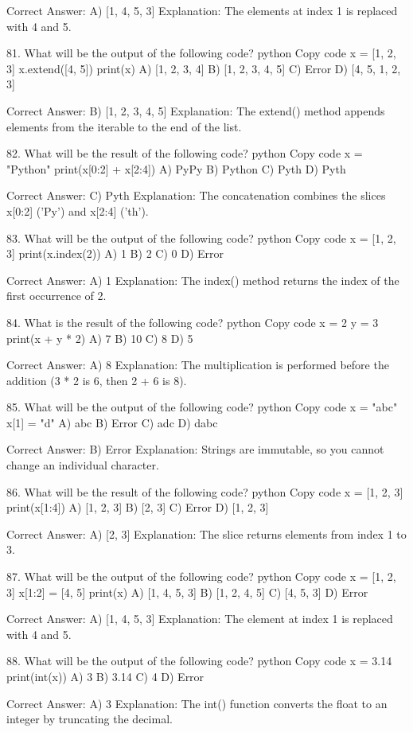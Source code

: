 Correct Answer: A) [1, 4, 5, 3]
Explanation: The elements at index 1 is replaced with 4 and 5.

81. What will be the output of the following code?
python
Copy code
x = [1, 2, 3]
x.extend([4, 5])
print(x)
A) [1, 2, 3, 4]
B) [1, 2, 3, 4, 5]
C) Error
D) [4, 5, 1, 2, 3]

Correct Answer: B) [1, 2, 3, 4, 5]
Explanation: The extend() method appends elements from the iterable to the end of the list.

82. What will be the result of the following code?
python
Copy code
x = "Python"
print(x[0:2] + x[2:4])
A) PyPy
B) Python
C) Pyth
D) Pyth

Correct Answer: C) Pyth
Explanation: The concatenation combines the slices x[0:2] ('Py') and x[2:4] ('th').

83. What will be the output of the following code?
python
Copy code
x = [1, 2, 3]
print(x.index(2))
A) 1
B) 2
C) 0
D) Error

Correct Answer: A) 1
Explanation: The index() method returns the index of the first occurrence of 2.

84. What is the result of the following code?
python
Copy code
x = 2
y = 3
print(x + y * 2)
A) 7
B) 10
C) 8
D) 5

Correct Answer: A) 8
Explanation: The multiplication is performed before the addition (3 * 2 is 6, then 2 + 6 is 8).

85. What will be the output of the following code?
python
Copy code
x = "abc"
x[1] = "d"
A) abc
B) Error
C) adc
D) dabc

Correct Answer: B) Error
Explanation: Strings are immutable, so you cannot change an individual character.

86. What will be the result of the following code?
python
Copy code
x = [1, 2, 3]
print(x[1:4])
A) [1, 2, 3]
B) [2, 3]
C) Error
D) [1, 2, 3]

Correct Answer: A) [2, 3]
Explanation: The slice returns elements from index 1 to 3.

87. What will be the output of the following code?
python
Copy code
x = [1, 2, 3]
x[1:2] = [4, 5]
print(x)
A) [1, 4, 5, 3]
B) [1, 2, 4, 5]
C) [4, 5, 3]
D) Error

Correct Answer: A) [1, 4, 5, 3]
Explanation: The element at index 1 is replaced with 4 and 5.

88. What will be the output of the following code?
python
Copy code
x = 3.14
print(int(x))
A) 3
B) 3.14
C) 4
D) Error

Correct Answer: A) 3
Explanation: The int() function converts the float to an integer by truncating the decimal.

